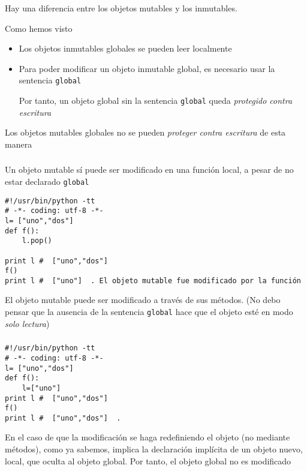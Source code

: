 \documentclass[ucs]{beamer}
\begin{document}
\begin{frame}[fragile]
\frametitle{}
Hay una diferencia entre los objetos mutables y los inmutables.

Como hemos visto
\begin{itemize}
\item
Los objetos inmutables globales se pueden leer localmente
\item
Para poder modificar un objeto inmutable global, es necesario
usar la sentencia \verb|global|

Por tanto, un objeto global sin la sentencia \verb|global|
queda \emph{protegido contra escritura}
\end{itemize}

Los objetos mutables globales no se pueden \emph{proteger contra escritura}
de esta manera
\end{frame}




\begin{frame}[fragile]
\frametitle{}
Un objeto mutable sí puede ser modificado
en una función local, a pesar de no estar declarado \verb|global|


  \begin{footnotesize}
  \begin{verbatim}
#!/usr/bin/python -tt
# -*- coding: utf-8 -*-
l= ["uno","dos"]
def f():
    l.pop()   

print l #  ["uno","dos"]
f()
print l #  ["uno"]  . El objeto mutable fue modificado por la función
  \end{verbatim}
  \end{footnotesize}

El objeto mutable puede ser modificado a través de sus métodos.
(No debo pensar que la ausencia de la sentencia \verb|global|
hace que el objeto esté en modo \emph{solo lectura})
\end{frame}



\begin{frame}[fragile]
\frametitle{}

  \begin{footnotesize}
  \begin{verbatim}
#!/usr/bin/python -tt
# -*- coding: utf-8 -*-
l= ["uno","dos"]
def f():
    l=["uno"]
print l #  ["uno","dos"]
f()
print l #  ["uno","dos"]  . 
  \end{verbatim}
  \end{footnotesize}

En el caso de que la modificación se haga redefiniendo el objeto (no 
mediante métodos), como ya sabemos, implica la declaración implícita
de un objeto nuevo, local, que oculta al objeto global. Por tanto,
el objeto global no es modificado
\end{frame}
\end{document}
